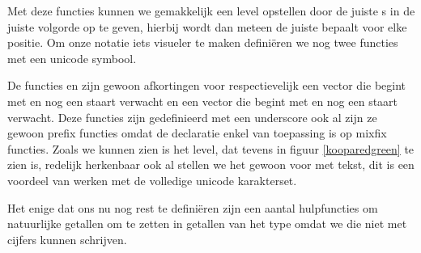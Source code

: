 Met deze functies kunnen we gemakkelijk een level opstellen door de juiste
s in de juiste volgorde op te geven, hierbij wordt dan meteen
de juiste  bepaalt voor elke positie. Om onze notatie iets
visueler te maken definiëren we nog twee functies met een unicode symbool.


De functies  en  zijn gewoon afkortingen voor
respectievelijk een vector die begint met  en nog een staart
verwacht en een vector die begint met  en nog een staart verwacht.
Deze functies zijn gedefinieerd met een underscore ook al zijn ze gewoon prefix
functies omdat de  declaratie enkel van toepassing is op mixfix
functies. Zoals we kunnen zien is het level, dat tevens in figuur
\ref{kooparedgreen} te zien is, redelijk herkenbaar ook al stellen we het
gewoon voor met tekst, dit is een voordeel van werken met de volledige unicode
karakterset.

Het enige dat ons nu nog rest te definiëren zijn een aantal hulpfuncties om
natuurlijke getallen om te zetten in getallen van het type  omdat
we die niet met cijfers kunnen schrijven.


